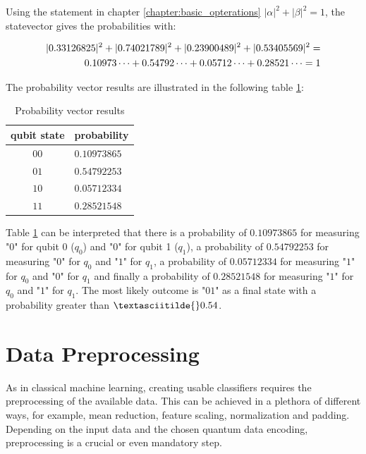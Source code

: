 Using the statement in chapter \ref{chapter:basic_opterations} $|\alpha|^2 + |\beta|^2 = 1$, the statevector gives the probabilities with:

\begin{equation}
    \centering
    \begin{split}
        |0.33126825|^2 + |0.74021789|^2 + |0.23900489|^2 + |0.53405569|^2 = \\
        0.10973\dots +0.54792\dots +0.05712\dots +0.28521\dots = 1 
    \end{split}
    \label{equation:angle_embedding_script_result_statevector}
\end{equation}

The probability vector results are illustrated in the following table \ref{table:angle_embedding_script_result_probabilities}:

\begin{table}[!h]
    \centering
    \begin{tabular}{|c|l|}
        \hline
        qubit state & probability    \\ \hline
        $00$        & $0.10973865$   \\ \hline
        $01$        & $0.54792253$   \\ \hline
        $10$        & $0.05712334$   \\ \hline
        $11$        & $0.28521548$   \\ \hline
        \end{tabular}
    \caption{Probability vector results}
    \label{table:angle_embedding_script_result_probabilities}
\end{table}

Table \ref{table:angle_embedding_script_result_probabilities} can be interpreted that there is a probability of $0.10973865$ for measuring "$0$" for qubit 0 ($q_0$) and "$0$" for qubit 1 ($q_1$), a probability of $0.54792253$ for measuring "$0$" for $q_0$ and "$1$" for $q_1$, a probability of $0.05712334$ for measuring "$1$" for $q_0$ and "$0$" for $q_1$ and finally a probability of $0.28521548$ for measuring "$1$" for $q_0$ and "$1$" for $q_1$. The most likely outcome is "$01$" as a final state with a probability greater than $\textasciitilde{}0.54$.

\section{Data Preprocessing}
\label{section:data_preprocessing}
As in classical machine learning, creating usable classifiers requires the preprocessing of the available data. This can be achieved in a plethora of different ways, for example, mean reduction, feature scaling, normalization and padding. Depending on the input data and the chosen quantum data encoding, preprocessing is a crucial or even mandatory step\cite{PoincarDataPreprocessinForQuantumMachineLearning_2021,VariationalClassifierPennyLane,SHRIVASTAVA20201849}. 

